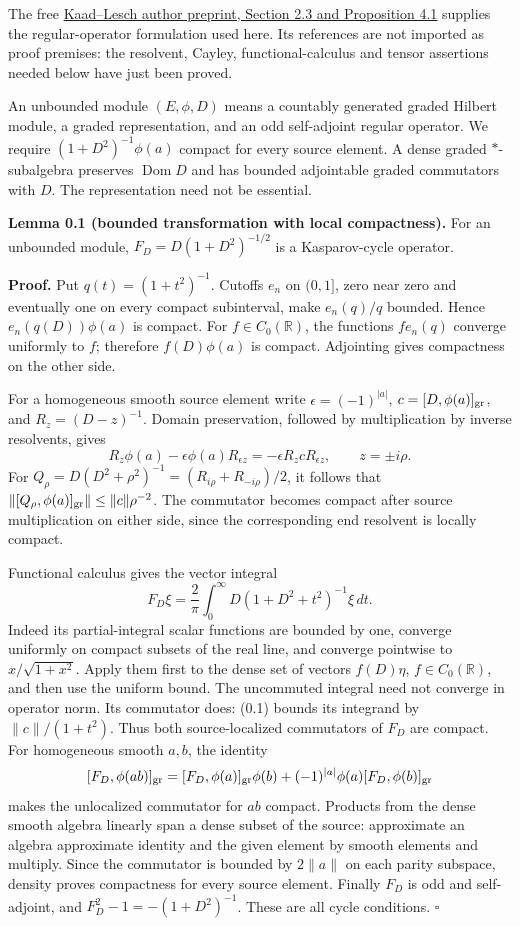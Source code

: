 \documentclass[
  11pt,
]{article}
\begin{document}
The free
\href{https://www.math.uni-bonn.de/people/lesch/dl/pap/2011-KaaLes-ArXiv-v2.pdf}{Kaad--Lesch
author preprint, Section 2.3 and Proposition 4.1} supplies the
regular-operator formulation used here. Its references are not imported
as proof premises: the resolvent, Cayley, functional-calculus and tensor
assertions needed below have just been proved.

An unbounded module \((E,\phi,D)\) means a countably generated graded
Hilbert module, a graded representation, and an odd self-adjoint regular
operator. We require \((1+D^2)^{-1}\phi(a)\) compact for every source
element. A dense graded \(*\)-subalgebra preserves
\(\operatorname{Dom}D\) and has bounded adjointable graded commutators
with \(D\). The representation need not be essential.

\textbf{Lemma 0.1 (bounded transformation with local compactness).} For
an unbounded module, \(F_D=D(1+D^2)^{-1/2}\) is a Kasparov-cycle
operator.

\textbf{Proof.} Put \(q(t)=(1+t^2)^{-1}\). Cutoffs \(e_n\) on \((0,1]\),
zero near zero and eventually one on every compact subinterval, make
\(e_n(q)/q\) bounded. Hence \(e_n(q(D))\phi(a)\) is compact. For
\(f\in C_0(\mathbb R)\), the functions \(fe_n(q)\) converge uniformly to
\(f\); therefore \(f(D)\phi(a)\) is compact. Adjointing gives
compactness on the other side.

For a homogeneous smooth source element write \(\epsilon=(-1)^{|a|}\),
\(c=[D,\phi(a)]_{\rm gr}\), and \(R_z=(D-z)^{-1}\). Domain preservation,
followed by multiplication by inverse resolvents, gives \[
R_z\phi(a)-\epsilon\phi(a)R_{\epsilon z}
=-\epsilon R_zcR_{\epsilon z},\qquad z=\pm i\rho.
\tag{0.1}
\] For \(Q_\rho=D(D^2+\rho^2)^{-1}=(R_{i\rho}+R_{-i\rho})/2\), it
follows that \(\|[Q_\rho,\phi(a)]_{\rm gr}\|\leq\|c\|\rho^{-2}\). The
commutator becomes compact after source multiplication on either side,
since the corresponding end resolvent is locally compact.

Functional calculus gives the vector integral \[
F_D\xi=\frac2\pi\int_0^\infty
D(1+D^2+t^2)^{-1}\xi\,dt.
\tag{0.2}
\] Indeed its partial-integral scalar functions are bounded by one,
converge uniformly on compact subsets of the real line, and converge
pointwise to \(x/\sqrt{1+x^2}\). Apply them first to the dense set of
vectors \(f(D)\eta\), \(f\in C_0(\mathbb R)\), and then use the uniform
bound. The uncommuted integral need not converge in operator norm. Its
commutator does: (0.1) bounds its integrand by \(\|c\|/(1+t^2)\). Thus
both source-localized commutators of \(F_D\) are compact. For
homogeneous smooth \(a,b\), the identity \[
[F_D,\phi(ab)]_{\rm gr}
=[F_D,\phi(a)]_{\rm gr}\phi(b)
 +(-1)^{|a|}\phi(a)[F_D,\phi(b)]_{\rm gr}
\] makes the unlocalized commutator for \(ab\) compact. Products from
the dense smooth algebra linearly span a dense subset of the source:
approximate an algebra approximate identity and the given element by
smooth elements and multiply. Since the commutator is bounded by
\(2\|a\|\) on each parity subspace, density proves compactness for every
source element. Finally \(F_D\) is odd and self-adjoint, and
\(F_D^2-1=-(1+D^2)^{-1}\). These are all cycle conditions. \(\square\)
\end{document}
